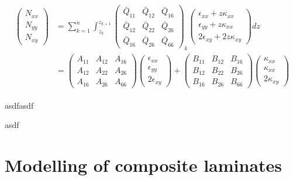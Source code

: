\begin{gather} 
	\begin{aligned}
		\begin{pmatrix}
			N_{xx} \\
			N_{yy} \\
			N_{xy} 
		\end{pmatrix} 
		& = 
		\sum_{k=1}^n
		\int_{z_k}^{z_{k+1}}
		{\begin{pmatrix}
			\bar{Q}_{11} & \bar{Q}_{12} &  \bar{Q}_{16} \\
			\bar{Q}_{12} & \bar{Q}_{22} &  \bar{Q}_{26} \\
			\bar{Q}_{16} & \bar{Q}_{26} & \bar{Q}_{66} 
		\end{pmatrix}}_k
		\begin{pmatrix}
			\epsilon_{xx} + z \kappa_{xx}\\
			\epsilon_{yy} + z \kappa_{xx}\\
			2\epsilon_{xy} + 2z\kappa_{xy}
		\end{pmatrix}
		dz \\
		& =
		\begin{pmatrix}
			{A}_{11} & {A}_{12} &  {A}_{16} \\
			{A}_{12} & {A}_{22} &  {A}_{26} \\
			{A}_{16} & {A}_{26} & {A}_{66} 
		\end{pmatrix}
		\begin{pmatrix}
		\epsilon_{xx}\\
		\epsilon_{yy}\\
		2\epsilon_{xy}
		\end{pmatrix}
		+
		\begin{pmatrix}
		{B}_{11} & {B}_{12} &  {B}_{16} \\
		{B}_{12} & {B}_{22} &  {B}_{26} \\
		{B}_{16} & {B}_{26} & {B}_{66} 
		\end{pmatrix}
		\begin{pmatrix}
		 \kappa_{xx}\\
		\kappa_{xx}\\
		2\kappa_{xy}
		\end{pmatrix}
		\label{eqscomp_laminate_constitutive3}
	\end{aligned}
\end{gather}

asdfasdf







asdf

\section{Modelling of composite laminates}

